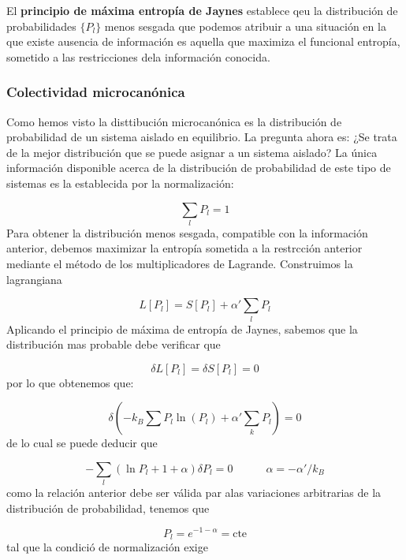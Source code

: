 \documentclass[12pt,a4paper]{article}
\numberwithin{equation}{section}
\numberwithin{figure}{section}
\newcommand{\tquad}{\quad \quad \quad}
\newcommand{\parentesis}[1]{\left( #1  \right)}
\newcommand{\cte}{\mathrm{cte}}
\theoremstyle{definition}
\begin{document}
El \textbf{principio de máxima entropía de Jaynes} establece qeu la distribución de probabilidades $\{ P_l \}$ menos sesgada que podemos atribuir a una situación en la que existe ausencia de información es aquella que maximiza el funcional entropía, sometido a las restricciones dela información conocida.

\subsubsection{Colectividad microcanónica}

Como hemos visto la disttibución microcanónica es la distribución de probabilidad de un sistema aislado en equilibrio. La pregunta ahora es: ¿Se trata de la mejor distribución que se puede asignar a un sistema aislado? La única información disponible acerca de la distribución de probabilidad de este tipo de sistemas es  la establecida por la normalización:

\begin{equation}
\sum_l P_l = 1
\end{equation}
Para obtener la distribución menos sesgada, compatible con la información anterior, debemos maximizar la entropía sometida a la restrcción anterior mediante el método de los multiplicadores de Lagrande. Construimos la lagrangiana 

\begin{equation}
L[P_l]=S[P_l] + \alpha' \sum_l P_l
\end{equation}
Aplicando el principio de máxima de entropía de Jaynes, sabemos que la distribución mas probable debe verificar que

\begin{equation}
\delta L[P_l] =  \delta  S[P_l] = 0
\end{equation}
por lo que obtenemos que:

$$ \delta \parentesis{- k_B \sum P_l \ln (P_l) + \alpha' \sum_k P_l}=0 $$
de lo cual se puede deducir que

\begin{equation}
- \sum_l (\ln P_l + 1 + \alpha ) \delta P_l = 0 \tquad \alpha = - \alpha'/k_B
\end{equation}
como la relación anterior debe ser válida par alas variaciones arbitrarias de la distribución de probabilidad, tenemos que

\begin{equation}
P_l = e^{-1-\alpha} = \cte
\end{equation}
tal que la condició de normalización exige
\end{document}
